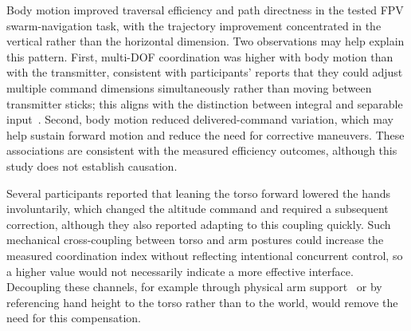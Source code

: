 \documentclass[a4paper,10pt,conference]{ieeeconf}
\begin{document}


Body motion improved traversal efficiency and path directness in the tested FPV
swarm-navigation task, with the trajectory improvement concentrated in the
vertical rather than the horizontal dimension. Two observations may help
explain this pattern. First, multi-DOF coordination was higher with body motion
than with the transmitter, consistent with participants' reports that they
could adjust multiple command dimensions simultaneously rather than moving
between transmitter sticks; this aligns with the distinction between integral
and separable input~\cite{jacob1994integrality,zhai1998quantifying}. Second,
body motion reduced delivered-command variation, which may help sustain forward
motion and reduce the need for corrective maneuvers. These associations are
consistent with the measured efficiency outcomes, although this study does not
establish causation.

Several participants reported that leaning the torso forward lowered the hands
involuntarily, which changed the altitude command and required a subsequent
correction, although they also reported adapting to this coupling quickly. Such
mechanical cross-coupling between torso and arm postures could increase the
measured coordination index without reflecting intentional concurrent control,
so a higher value would not necessarily indicate a more effective interface.
Decoupling these channels, for example through physical arm
support~\cite{rognon2018flyjacket} or by referencing hand height to the torso
rather than to the world, would remove the need for this compensation.
\end{document}
